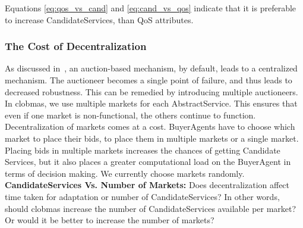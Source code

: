 \documentclass[10pt,journal,compsoc]{IEEEtran}
\begin{document}
Equations \ref{eq:qos_vs_cand} and \ref{eq:cand_vs_qos} indicate that it is preferable to increase CandidateServices, than QoS attributes. 


\subsubsection{The Cost of Decentralization}
As discussed in~\cite{Eymann2003Decentralized}, an auction-based mechanism, by default, leads to a centralized mechanism. The auctioneer becomes a single point of failure, and thus leads to decreased robustness. This can be remedied by introducing multiple auctioneers. In clobmas, we use multiple markets for each AbstractService. This ensures that even if one market is non-functional, the others continue to function. Decentralization of markets comes at a cost. BuyerAgents have to choose which market to place their bids, to place them in multiple markets or a single market. Placing bids in multiple markets increases the chances of getting Candidate Services, but it also places a greater computational load on the BuyerAgent in terms of decision making. We currently choose markets randomly.\\
\textbf{CandidateServices Vs. Number of Markets:} Does decentralization affect time taken for adaptation or number of CandidateServices? In other words, should clobmas increase the number of CandidateServices available per market? Or would it be better to increase the number of markets? 
\end{document}
